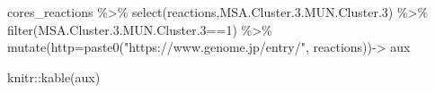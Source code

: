 \documentclass[
  letterpaper,
  DIV=11,
  numbers=noendperiod]{scrreprt}
\newenvironment{Shaded}{}{}
\newcommand{\AttributeTok}[1]{\textcolor[rgb]{0.78,0.47,0.87}{#1}}
\newcommand{\DecValTok}[1]{\textcolor[rgb]{0.82,0.60,0.40}{#1}}
\newcommand{\FunctionTok}[1]{\textcolor[rgb]{0.38,0.69,0.94}{#1}}
\newcommand{\NormalTok}[1]{\textcolor[rgb]{0.67,0.70,0.75}{#1}}
\newcommand{\OtherTok}[1]{\textcolor[rgb]{0.15,0.68,0.38}{#1}}
\newcommand{\SpecialCharTok}[1]{\textcolor[rgb]{0.34,0.71,0.76}{#1}}
\newcommand{\StringTok}[1]{\textcolor[rgb]{0.60,0.76,0.47}{#1}}
\begin{document}
\begin{Shaded}
\begin{Highlighting}[]
\NormalTok{ cores\_reactions }\SpecialCharTok{\%\textgreater{}\%} \FunctionTok{select}\NormalTok{(reactions,}\StringTok{\textasciigrave{}}\AttributeTok{MSA.Cluster.3.MUN.Cluster.3}\StringTok{\textasciigrave{}}\NormalTok{) }\SpecialCharTok{\%\textgreater{}\%}
  \FunctionTok{filter}\NormalTok{(}\StringTok{\textasciigrave{}}\AttributeTok{MSA.Cluster.3.MUN.Cluster.3}\StringTok{\textasciigrave{}}\SpecialCharTok{==}\DecValTok{1}\NormalTok{) }\SpecialCharTok{\%\textgreater{}\%}
  \FunctionTok{mutate}\NormalTok{(}\AttributeTok{http=}\FunctionTok{paste0}\NormalTok{(}\StringTok{"https://www.genome.jp/entry/"}\NormalTok{,}
\NormalTok{                     reactions))}\OtherTok{{-}\textgreater{}}\NormalTok{ aux}
\end{Highlighting}
\end{Shaded}

\begin{Shaded}
\begin{Highlighting}[]
\NormalTok{knitr}\SpecialCharTok{::}\FunctionTok{kable}\NormalTok{(aux)}
\end{Highlighting}
\end{Shaded}
\end{document}
